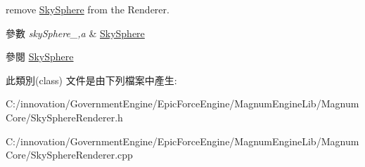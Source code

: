remove \hyperlink{class_i_dream_sky_1_1_sky_sphere}{Sky\+Sphere} from the Renderer. 


\begin{DoxyParams}{參數}
{\em sky\+Sphere\+\_\+,a} & \hyperlink{class_i_dream_sky_1_1_sky_sphere}{Sky\+Sphere} \\
\hline
\end{DoxyParams}
\begin{DoxySeeAlso}{參閱}
\hyperlink{class_i_dream_sky_1_1_sky_sphere}{Sky\+Sphere} 
\end{DoxySeeAlso}


此類別(class) 文件是由下列檔案中產生\+:\begin{DoxyCompactItemize}
\item 
C\+:/innovation/\+Government\+Engine/\+Epic\+Force\+Engine/\+Magnum\+Engine\+Lib/\+Magnum\+Core/Sky\+Sphere\+Renderer.\+h\item 
C\+:/innovation/\+Government\+Engine/\+Epic\+Force\+Engine/\+Magnum\+Engine\+Lib/\+Magnum\+Core/Sky\+Sphere\+Renderer.\+cpp\end{DoxyCompactItemize}
